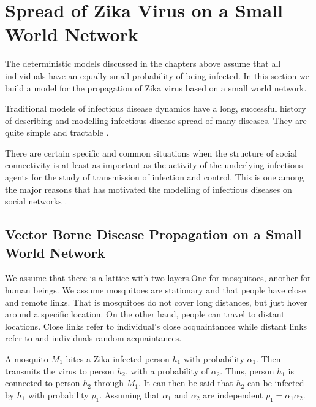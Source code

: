 \chapter{ Spread of Zika Virus on a Small World Network }

The deterministic models discussed in the chapters above assume that all individuals have an equally small probability of being infected. In this section we build a model for the propagation of Zika virus based on a small world network.

Traditional models of infectious disease dynamics have a long, successful history of describing and modelling infectious disease spread of many diseases. They are quite simple and tractable \citep{fu2013propagation}.

There are certain specific and common situations when the structure of social connectivity is at least as important as the  activity of the underlying infectious agents for the study of transmission of infection and control. This is one among the major reasons that has motivated the modelling of infectious diseases on social networks \cite{fu2013propagation}.



\section{ Vector Borne Disease Propagation on a Small World Network}


We assume that there is a lattice with two layers.One for mosquitoes, another for human beings. We assume mosquitoes are stationary and that people have close and remote links. That is mosquitoes do not cover long distances, but just hover around a specific location.
On the other hand, people can travel to distant locations. Close links refer to individual's close acquaintances while distant links refer to and individuals random acquaintances.
 
A mosquito $M_1$ bites a Zika infected person $h_1$ with probability $\alpha_1$. Then transmits the virus to person $h_2$, with a probability of $\alpha_2$. Thus, person $h_1$ is connected to  person $h_2$ through $M_1$. It can then be said that $h_2$ can be infected by $h_1$ with probability $p_1$. Assuming that $\alpha_1 $ and $\alpha_2$ are independent  $p_1 =  \alpha_1 \alpha_2$. 

